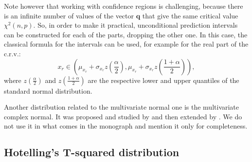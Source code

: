 \documentclass[
]{book}
\begin{document}
Note however that working with confidence regions is challenging, because there is an infinite number of values of the vector \(\mathbf{q}\) that give the same critical value \(\chi^2(n, p)\). So, in order to make it practical, unconditional prediction intervals can be constructed for each of the parts, dropping the other one. In this case, the classical formula for the intervals can be used, for example for the real part of the c.r.v.:
\begin{equation}
    x_{r} \in \left( \mu_{x_r} + \sigma_{x_r} z \left({\frac{\alpha}{2}} \right) , \mu_{x_r} + \sigma_{x_r} z \left({\frac{1+\alpha}{2}} \right) \right),
    \label{eq:NormalInterval}
\end{equation}
where \(z\left({\frac{\alpha}{2}} \right)\) and \(z\left({\frac{1+\alpha}{2}} \right)\) are the respective lower and upper quantiles of the standard normal distribution.

Another distribution related to the multivariate normal one is the multivariate complex normal. It was proposed and studied by \citet{Goodman1963} and then extended by \citet{vandenBos1995}. We do not use it in what comes in the monograph and mention it only for completeness.

\hypertarget{Hotelling}{%
\subsection{Hotelling's T-squared distribution}\label{Hotelling}}
\end{document}
